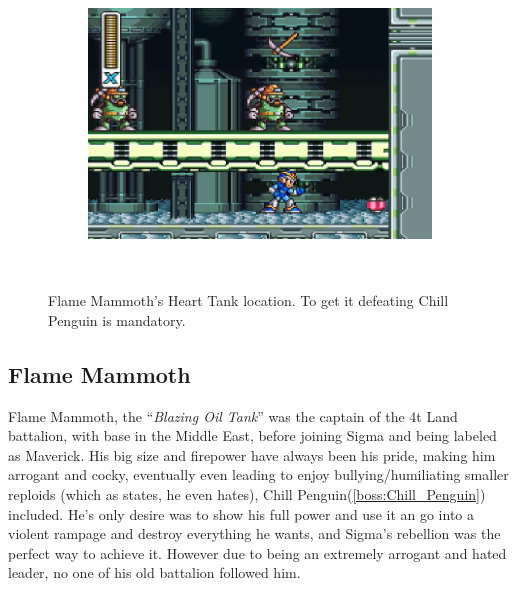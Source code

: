 \begin{figure}[h]
	\centering
	\begin{subfigure}{0.5\textwidth}
		\centering
		\includegraphics[width=\linewidth]{figures/X1/Flame_heart_2.jpg}
		\caption{}
	\end{subfigure}\\
	\caption{Flame Mammoth's Heart Tank location. To get it defeating Chill Penguin is mandatory.}
\end{figure}

\subsection{Flame Mammoth}\label{boss:Flame_mammoth}
Flame Mammoth, the ``\textit{Blazing Oil Tank}''\cite{book:MMX_Complete_art} was the captain of the 4t Land battalion, with base in the Middle East, before joining Sigma and being labeled as Maverick. His big size and firepower have always been his pride, making him arrogant and cocky, eventually even leading to enjoy bullying/humiliating smaller reploids (which as \cite{wayback:X_resources} states, he even hates), Chill Penguin(\ref{boss:Chill_Penguin})\cite{wiki:Flame_mammoth} included. He's only desire was to show his full power and use it an go into a violent rampage and destroy everything he wants, and Sigma's rebellion was the perfect way to achieve it. However due to being an extremely arrogant and hated leader, no one of his old battalion followed him\cite{MHX:manual}.

